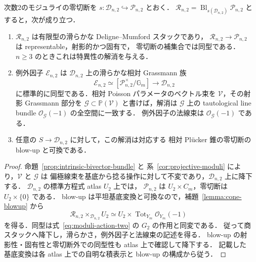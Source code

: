 \begin{theorem}
\label{thm:poisson-resolution}
次数2のモジュライの零切断を
$s:\mathcal D_{n,2}\hookrightarrow\mathcal P_{n,2}$ とおく．
$\mathcal R_{n,2}=\operatorname{Bl}_{s(\mathcal D_{n,2})}\mathcal P_{n,2}$
とすると，次が成り立つ．
\begin{enumerate}
\item $\mathcal R_{n,2}$ は有限型の滑らかな Deligne--Mumford スタックであり，
$\mathcal R_{n,2}\to\mathcal P_{n,2}$ は representable，射影的かつ固有で，
零切断の補集合では同型である．$n\geq3$ のときこれは特異性の解消を与える．
\item 例外因子 $\mathcal E_{n,2}$ は $\mathcal D_{n,2}$ 上の滑らかな相対
Grassmann 族
\[
 \mathcal E_{n,2}\simeq
 [\mathcal P_{n,2}^{\times}/\mathbb G_m]
\longrightarrow\mathcal D_{n,2}
\]
に標準的に同型である．相対 Poisson パラメータのベクトル束を
$\mathcal V$，その射影 Grassmann 部分を $\mathcal G\subset\mathbb P(\mathcal V)$
と書けば，解消は $\mathcal G$ 上の tautological line bundle
$\mathcal O_{\mathcal G}(-1)$ の全空間に一致する．
例外因子の法線束は $\mathcal O_{\mathcal G}(-1)$ である．
\item 任意の $S\to\mathcal D_{n,2}$ に対して，この解消は対応する
相対 Pl\"ucker 錐の零切断の blow-up と可換である．
\end{enumerate}
\end{theorem}
\begin{proof}
命題~\ref{prop:intrinsic-bivector-bundle} と
系~\ref{cor:projective-moduli} により，$\mathcal V$ と $\mathcal G$ は
偏極線束を基底から捻る操作に対して不変であり，$\mathcal D_{n,2}$ 上に降下する．
$\mathcal D_{n,2}$ の標準方程式 atlas $U_2$ 上では，
$\mathcal P_{n,2}$ は $U_2\times C_m$，零切断は $U_2\times\{0\}$ である．
blow-up は平坦基底変換と可換なので，補題~\ref{lemma:cone-blowup} から
\[
 \mathcal R_{n,2}\times_{\mathcal D_{n,2}}U_2
 \simeq U_2\times\operatorname{Tot}_{Y_m}\mathcal O_{Y_m}(-1)
\]
を得る．同型は式~\eqref{eq:moduli-action-two} の $G_2$ の作用と同変である．
従って商スタックへ降下し，滑らかさ，例外因子と法線束の記述を得る．
blow-up の射影性・固有性と零切断外での同型性も atlas 上で確認して降下する．
記載した基底変換は各 atlas 上での自明な積表示と blow-up の構成から従う．
\end{proof}

